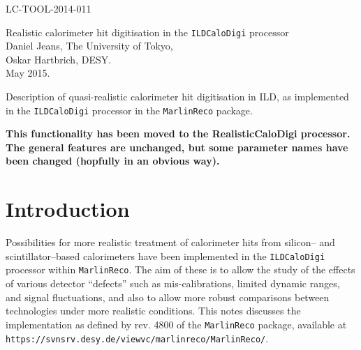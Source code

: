 \documentclass[12pt]{article} %
\begin{document}
{
\flushright
LC-TOOL-2014-011\\
}

\vspace{0.5cm}

{
\center
\Huge
Realistic calorimeter hit digitisation in the {\tt ILDCaloDigi} processor\\
}
%                                                                                                                                                             
\vspace{1cm}
%                                                                                                                                                             
{
\center
\Large
Daniel Jeans, The University of Tokyo, \\
Oskar Hartbrich, DESY.\\
}
%                                                                                                                                                             
\vspace{1cm}
%                                                                                                                                                             
{
 May 2015.\\
}

\vspace{1cm}

Description of quasi-realistic calorimeter hit digitisation in ILD, as implemented in
the {\tt ILDCaloDigi} processor in the {\tt MarlinReco} package. 

\vspace{1cm}

{\bf This functionality has been moved to the RealisticCaloDigi processor. 
The general features are unchanged, but some parameter names have been changed (hopfully in an obvious way).} \\



\section{Introduction}

Possibilities for more realistic treatment of calorimeter hits from silicon-- and scintillator--based calorimeters have been 
implemented in the {\tt ILDCaloDigi} processor within {\tt MarlinReco}. The aim of these is to allow the study of the effects 
of various detector ``defects'' such as mis-calibrations, limited dynamic ranges, and signal fluctuations, 
and also to allow more robust comparisons between technologies under more realistic conditions.
This notes discusses the implementation as defined by rev. 4800 of the {\tt MarlinReco} package, available at
{\tt https://svnsrv.desy.de/viewvc/marlinreco/MarlinReco/}.
\end{document}
